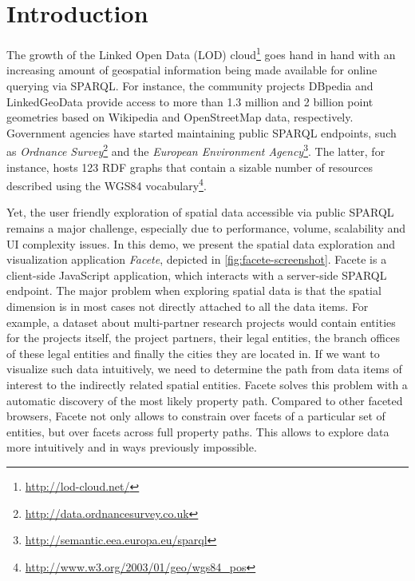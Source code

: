 
\section{Introduction}
\label{sec:introduction}

The growth of the Linked Open Data (LOD)
cloud\footnote{\url{http://lod-cloud.net/}}
goes hand in hand with an increasing amount of geospatial information being made available
for online querying via SPARQL.
For instance, the community projects DBpedia and LinkedGeoData provide access
to more than 1.3 million and 2 billion point geometries based on Wikipedia and
OpenStreetMap data, respectively. Government agencies have started maintaining
public SPARQL endpoints, such as \emph{Ordnance
Survey}\footnote{\url{http://data.ordnancesurvey.co.uk}}
and the \emph{European Environment
Agency}\footnote{\url{http://semantic.eea.europa.eu/sparql}}.
The latter, for instance, hosts
123 RDF graphs that contain a sizable number of resources described using
the WGS84 vocabulary\footnote{\url{http://www.w3.org/2003/01/geo/wgs84_pos}}.

Yet, the user friendly exploration of spatial data accessible via public SPARQL remains a
major challenge, especially due to performance, volume, scalability and UI
complexity issues.
In this demo, we present the spatial data exploration and
visualization application \emph{Facete}, depicted in
\autoref{fig:facete-screenshot}.
Facete is a client-side JavaScript application, which interacts with a server-side SPARQL endpoint.
The major problem when exploring spatial data is that the spatial dimension is in most cases not directly attached to all the data items.
For example, a dataset about multi-partner research projects would contain entities for the projects itself, the project partners, their legal entities, the branch offices of these legal entities and finally the cities they are located in.
If we want to visualize such data intuitively, we need to determine the path from data items of interest to the indirectly related spatial entities.
Facete solves this problem with a automatic discovery of the most likely property path.
Compared to other faceted browsers, Facete not only allows to constrain over facets of a particular set of entities, but over facets across full property paths.
This allows to explore data more intuitively and in ways previously impossible.

